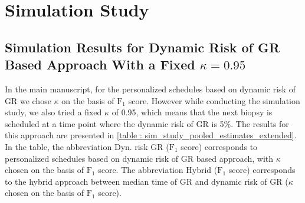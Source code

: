 \section{Simulation Study}
\subsection{Simulation Results for Dynamic Risk of GR Based Approach With a Fixed $\kappa = 0.95$}
In the main manuscript, for the personalized schedules based on dynamic risk of GR we chose $\kappa$ on the basis of $\mbox{F}_1$ score. However while conducting the simulation study, we also tried a fixed $\kappa$ of 0.95, which means that the next biopsy is scheduled at a time point where the dynamic risk of GR is 5\%. The results for this approach are presented in \ref{table : sim_study_pooled_estimates_extended}. In the table, the abbreviation Dyn. risk GR ($\mbox{F}_1$ score) corresponds to personalized schedules based on dynamic risk of GR based approach, with $\kappa$ chosen on the basis of $\mbox{F}_1$ score. The abbreviation Hybrid ($\mbox{F}_1$ score) corresponds to the hybrid approach between median time of GR and dynamic risk of GR ($\kappa$ chosen on the basis of $\mbox{F}_1$ score).

